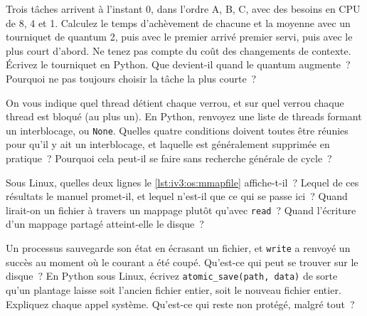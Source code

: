\begin{question}\label{iq:iv3:operating-systems-concurrency-and-networks:15}
Trois tâches arrivent à l'instant 0, dans l'ordre A, B, C, avec des besoins en CPU de 8, 4 et 1. Calculez le temps d'achèvement de chacune et la moyenne avec un tourniquet de quantum 2, puis avec le premier arrivé premier servi, puis avec le plus court d'abord. Ne tenez pas compte du coût des changements de contexte. Écrivez le tourniquet en Python. Que devient-il quand le quantum augmente~? Pourquoi ne pas toujours choisir la tâche la plus courte~?
\end{question}

\begin{question}\label{iq:iv3:operating-systems-concurrency-and-networks:16}
On vous indique quel thread détient chaque verrou, et sur quel verrou chaque thread est bloqué (au plus un). En Python, renvoyez une liste de threads formant un interblocage, ou \texttt{None}. Quelles quatre conditions doivent toutes être réunies pour qu'il y ait un interblocage, et laquelle est généralement supprimée en pratique~? Pourquoi cela peut-il se faire sans recherche générale de cycle~?
\end{question}

\begin{question}\label{iq:iv3:operating-systems-concurrency-and-networks:17}
Sous Linux, quelles deux lignes le \cref{lst:iv3:os:mmapfile} affiche-t-il~? Lequel de ces résultats le manuel promet-il, et lequel n'est-il que ce qui se passe ici~? Quand lirait-on un fichier à travers un mappage plutôt qu'avec \texttt{read}~? Quand l'écriture d'un mappage partagé atteint-elle le disque~?
\label{lst:iv3:os:mmapfile}
\end{question}

\begin{question}\label{iq:iv3:operating-systems-concurrency-and-networks:18}
Un processus sauvegarde son état en écrasant un fichier, et \texttt{write} a renvoyé un succès au moment où le courant a été coupé. Qu'est-ce qui peut se trouver sur le disque~? En Python sous Linux, écrivez \texttt{atomic\_save(path, data)} de sorte qu'un plantage laisse soit l'ancien fichier entier, soit le nouveau fichier entier. Expliquez chaque appel système. Qu'est-ce qui reste non protégé, malgré tout~?
\end{question}

